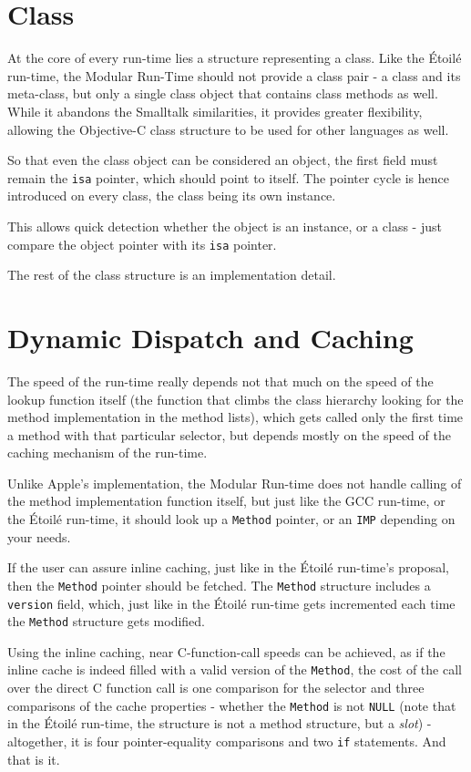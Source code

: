 \section{Class}

At the core of every run-time lies a structure representing a class. Like the \'Etoil\'e run-time, the Modular Run-Time should not provide a class pair - a class and its meta-class, but only a single class object that contains class methods as well. While it abandons the Smalltalk similarities, it provides greater flexibility, allowing the Objective-C class structure to be used for other languages as well.

So that even the class object can be considered an object, the first field must remain the \verb=isa= pointer, which should point to itself. The pointer cycle is hence introduced on every class, the class being its own instance.

This allows quick detection whether the object is an instance, or a class - just compare the object pointer with its \verb=isa= pointer.

The rest of the class structure is an implementation detail.

\section{Dynamic Dispatch and Caching}

The speed of the run-time really depends not that much on the speed of the lookup function itself (the function that climbs the class hierarchy looking for the method implementation in the method lists), which gets called only the first time a method with that particular selector, but depends mostly on the speed of the caching mechanism of the run-time.

Unlike Apple's implementation, the Modular Run-time does not handle calling of the method implementation function itself, but just like the GCC run-time, or the \'Etoil\'e run-time, it should look up a \verb=Method= pointer, or an \verb=IMP= depending on your needs.

If the user can assure inline caching, just like in the \'Etoil\'e run-time's proposal, then the \verb=Method= pointer should be fetched. The \verb=Method= structure includes a \verb=version= field, which, just like in the \'Etoil\'e run-time gets incremented each time the \verb=Method= structure gets modified.

Using the inline caching, near C-function-call speeds can be achieved, as if the inline cache is indeed filled with a valid version of the \verb=Method=, the cost of the call over the direct C function call is one comparison for the selector and three comparisons of the cache properties - whether the \verb=Method= is not \verb=NULL= (note that in the \'Etoil\'e run-time, the structure is not a method structure, but a \emph{slot}) - altogether, it is four pointer-equality comparisons and two \verb=if= statements. And that is it.

